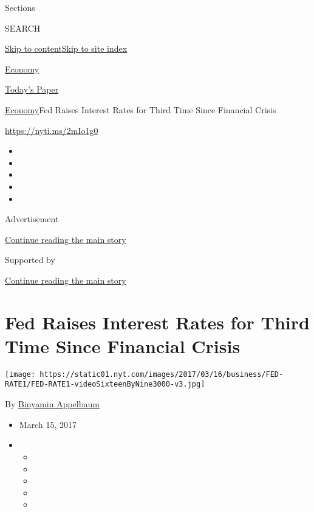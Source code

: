 Sections

SEARCH

\protect\hyperlink{site-content}{Skip to
content}\protect\hyperlink{site-index}{Skip to site index}

\href{https://www.nytimes.com/section/business/economy}{Economy}

\href{https://myaccount.nytimes.com/auth/login?response_type=cookie\&client_id=vi}{}

\href{https://www.nytimes.com/section/todayspaper}{Today's Paper}

\href{/section/business/economy}{Economy}\textbar{}Fed Raises Interest
Rates for Third Time Since Financial Crisis

\url{https://nyti.ms/2mIo1g0}

\begin{itemize}
\item
\item
\item
\item
\item
\end{itemize}

Advertisement

\protect\hyperlink{after-top}{Continue reading the main story}

Supported by

\protect\hyperlink{after-sponsor}{Continue reading the main story}

\hypertarget{fed-raises-interest-rates-for-third-time-since-financial-crisis}{%
\section{Fed Raises Interest Rates for Third Time Since Financial
Crisis}\label{fed-raises-interest-rates-for-third-time-since-financial-crisis}}

\texttt{[image: https://static01.nyt.com/images/2017/03/16/business/FED-RATE1/FED-RATE1-videoSixteenByNine3000-v3.jpg]}

By \href{http://www.nytimes.com/by/binyamin-appelbaum}{Binyamin
Appelbaum}

\begin{itemize}
\item
  March 15, 2017
\item
  \begin{itemize}
  \item
  \item
  \item
  \item
  \item
  \end{itemize}
\end{itemize}

